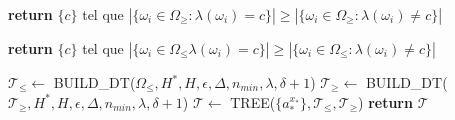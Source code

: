 \documentclass[a4paper]{article}
\begin{document}
\begin{algorithm}[H]
\begin{algorithmic}
    \State \textbf{return} $\{c\}$ tel que $|\{\omega_i \in \Omega_{\geq}:
    \lambda(\omega_i) = c\}| \geq |\{\omega_i \in \Omega_{\geq}:
    \lambda(\omega_i) \neq c\}|$
\EndIf

    \State \textbf{return} $\{c\}$ tel que $|\{\omega_i \in \Omega_{\leq}
    \lambda(\omega_i) = c\}| \geq |\{\omega_i \in \Omega_{\leq}:
    \lambda(\omega_i) \neq c\}|$
\EndIf

\State $\mathcal{T}_{\leq}\gets$ BUILD\_DT($\Omega_{\leq}, H^*, H, \epsilon, \Delta,
    n_{min}, \lambda, \delta +1$) 
\State $\mathcal{T}_{\geq}\gets$
    BUILD\_DT($\mathcal{T}_{\geq}, H^*, H, \epsilon, \Delta, n_{min}, \lambda, \delta
    +1$)
\State $\mathcal{T} \gets$ TREE($\{a^{x_*}_*\}, \mathcal{T}_{\leq}, \mathcal{T}_{\geq}$)
\State \textbf{return} $\mathcal{T}$

\EndProcedure
\end{algorithmic}
\end{algorithm}



\printbibliography 
\end{document}
